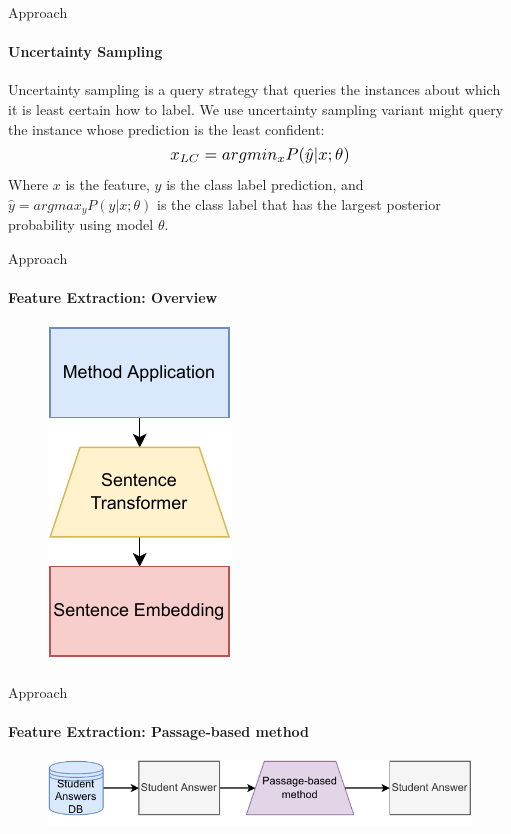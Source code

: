 \documentclass[aspectratio=169]{beamer}
\begin{document}
\begin{frame}{Approach}
	\framesubtitle{Uncertainty Sampling}
	Uncertainty sampling is a query strategy that queries the instances about which it is least certain how to label. We use uncertainty sampling variant might query the instance whose prediction is the least confident:
	\begin{equation}
	\label{equation:uncertainty sampling}
	\scalebox{1.2}{$x_{LC} = argmin_{x} P({\hat{y}|x;\theta})$}
	\end{equation}
	Where $x$ is the feature, $y$ is the class label prediction, and $\hat{y} = argmax_y P({y|x;\theta})$ is the class label that has the largest posterior probability using model $\theta$.
\end{frame}
\begin{frame}{Approach}
\framesubtitle{Feature Extraction: Overview}
\begin{figure}
	\centering
	\includegraphics[scale = 0.65]{images/feature_extraction.pdf}
	\label{fig:feature extraction}
\end{figure}
\end{frame}
\begin{frame}{Approach}
\framesubtitle{Feature Extraction: Passage-based method}
\begin{figure}
	\centering
	\includegraphics[scale = 0.65]{images/passage_FE_slides.pdf}
	\label{fig:passage fe slides}
\end{figure}
\end{frame}
\end{document}
